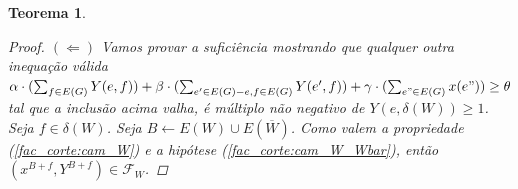 \documentclass[11pt,reqno]{amsart}
\newtheorem{teorema}{Teorema}
\newcommand{\incid}{\mathcal{X}}
\newcommand{\incidY}{\mathcal{Y}}
\newcommand{\facetF}{\mathcal{F}}
\begin{document}
\begin{teorema}
\begin{proof}





$(\Leftarrow)$ Vamos provar a suficiência mostrando que qualquer outra inequação 
válida $\alpha \cdot (\sum_{f \in E(G)}Y(e,f)) + \beta \cdot (\sum_{e' \in E(G) - e, f \in E(G)}Y(e',f)) + \gamma \cdot (\sum_{e" \in E(G)}x(e")) \ge \theta$
tal que a inclusão acima valha, é múltiplo não negativo de $Y(e,\delta(W)) \ge 1$. 
Seja $f \in \delta(W)$. Seja $B \leftarrow E(W) \cup E(\overline{W})$. 
Como valem a propriedade (\ref{fac_corte:cam_W}) e a hipótese 
(\ref{fac_corte:cam_W_Wbar}), então 
$(x^{B+f},Y^{B+f}) \in \facetF_{W}$. 


\end{proof}
\end{teorema}
\end{document}
